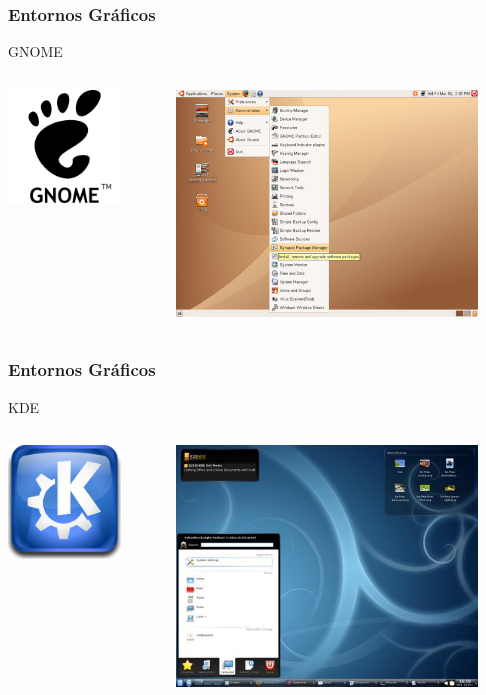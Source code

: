 \frame
{
\frametitle{Entornos Gráficos}
\Large{GNOME}
\begin{columns}
	\begin{column}{0.2\textwidth}
		\includegraphics[width=3cm]{img/gnome-logo}
	\end{column}
	\begin{column}{0.8\textwidth}
		\begin{center}
			\includegraphics[width=8cm]{img/gnome}
		\end{center}
	\end{column}
\end{columns}
}

\frame
{
\frametitle{Entornos Gráficos}
\Large{KDE}
\begin{columns}
	\begin{column}{0.2\textwidth}
		\includegraphics[width=3cm]{img/kde-logo}
	\end{column}
	\begin{column}{0.8\textwidth}
		\begin{center}
			\includegraphics[width=8cm]{img/kde}
		\end{center}
	\end{column}
\end{columns}
}

